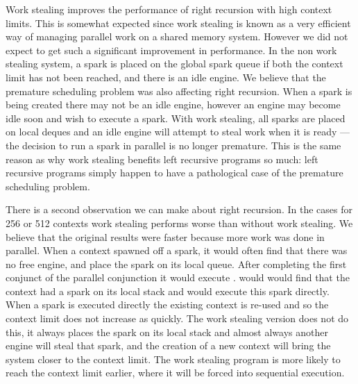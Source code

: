 Work stealing improves the performance of right recursion with high context
limits.
This is somewhat expected since work stealing is known as a very
efficient way of managing parallel work on a shared memory system.
However we did not expect to get such a significant improvement in
performance.
In the non work stealing system, a spark is placed on the global spark queue
if both the context limit has not been reached, and there is an idle engine.
We believe that the premature scheduling problem was also affecting right
recursion.
When a spark is being created there may not be an idle engine,
however an engine may become idle soon and wish to execute a spark.
With work stealing,
all sparks are placed on local deques and an idle
engine will attempt to steal work when it is ready ---
the decision to run a spark in parallel is no longer premature.
This is the same reason as why work stealing benefits left recursive
programs so much:
left recursive programs simply happen to have a pathological case of
the premature scheduling problem.

There is a second observation we can make about right recursion.
In the cases for 256 or 512 contexts work stealing performs worse than
without work stealing.
We believe that the original results were faster because more work was done
in parallel.
When a context spawned off a spark,
it would often find that there was no free engine,
and place the spark on its local queue.
After completing the first conjunct of the parallel conjunction it would
execute \joinandcontinue.
\joinandcontinue would would find that the context had a spark on its local
stack and would execute this spark directly.
When a spark is executed directly the existing context is re-used and so the
context limit does not increase as quickly.
The work stealing version does not do this,
it always places the spark on its local stack and almost always
another engine will steal that spark,
and the creation of a new context will bring the system closer to the
context limit.
The work stealing program is more likely to reach the context limit earlier,
where it will be forced into sequential execution.


